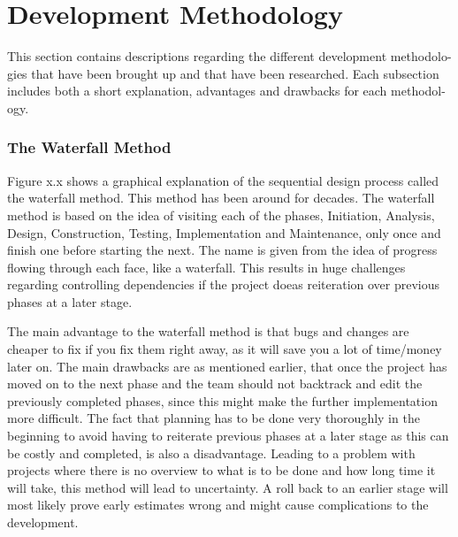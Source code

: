 \chapter{Development Methodology}
This section contains descriptions regarding the different development
methodolo- gies that have been brought up and that have been researched. Each subsection
includes both a short explanation, advantages and drawbacks for each methodol-
ogy.

\subsection{The Waterfall Method}
Figure x.x shows a graphical explanation of the sequential design process called the waterfall method. This method has been around for decades. The waterfall method is based on the idea of visiting each of the phases, Initiation, Analysis, Design, Construction, Testing, Implementation and Maintenance, only once and finish one before starting the next. The name is given from the idea of progress flowing through each face, like a waterfall. This results in huge challenges regarding controlling dependencies if the project doeas reiteration over previous phases at a later stage.

The main advantage to the waterfall method is that bugs and changes are cheaper to fix if you fix them right away, as it will save you a lot of time/money later on.
The main drawbacks are as mentioned earlier, that once the project has moved on to the next phase and the team should not backtrack and edit the previously completed phases, since this might make the further implementation more difficult. The fact that planning has to be done very thoroughly in the beginning to avoid having to reiterate previous phases at a later stage as this can be costly and completed, is also a disadvantage. Leading to a problem with projects where there is no overview to what is to be done and how long time it will take, this method will lead to uncertainty. A roll back to an earlier stage will most likely prove early estimates wrong and might cause complications to the development.

